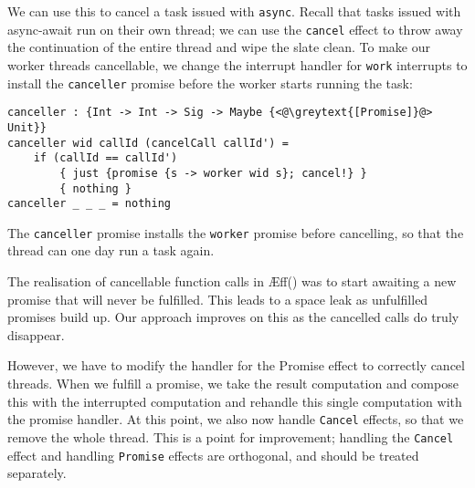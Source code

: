 \documentclass[msc,deptreport,cs]{infthesis} %
\newcommand{\code}[1]{\lstinline{#1}}
\newcommand{\texthighlight}[1]{%
  \colorbox{red!20}{#1}}
\newcommand{\greytext}[1]{\textcolor{black!40}{#1}}
\newcommand\aeff{{\AE}ff\xspace}
\newcommand{\todo}[1]
           {{\par\noindent\small\color{RoyalPurple}
  \framebox{\parbox{\dimexpr\linewidth-2\fboxsep-2\fboxrule}
    {\textbf{TODO:} #1}}}}
\begin{document}
\noindent We can use this to cancel a task issued with \code{async}. Recall that
tasks issued with async-await run on their own thread; we can use the
\code{cancel} effect to throw away the continuation of the entire thread and
wipe the slate clean. To make our worker threads cancellable, we change the
interrupt handler for \code{work} interrupts to install the \code{canceller}
promise before the worker starts running the task:


\begin{lstlisting}
canceller : {Int -> Int -> Sig -> Maybe {<@\greytext{[Promise]}@> Unit}}
canceller wid callId (cancelCall callId') =
    if (callId == callId')
        { just {promise {s -> worker wid s}; cancel!} }
        { nothing }
canceller _ _ _ = nothing
\end{lstlisting}

\noindent The \code{canceller} promise installs the \code{worker} promise before
cancelling, so that the thread can one day run a task again. \todo{fix}


The realisation of cancellable function calls in
\aeff(\cite{ahman2020asynchronous}) was to start awaiting a new promise that
will never be fulfilled. This leads to a space leak as unfulfilled promises
build up. Our approach improves on this as the cancelled calls do truly
disappear.


However, we have to modify the handler for the \textsf{Promise} effect to
correctly cancel threads. When we fulfill a promise, we take the result
computation and compose this with the interrupted computation and rehandle this
single computation with the promise handler. At this point, we also now handle
\code{Cancel} effects, so that we remove the whole thread. This is a point for
improvement; handling the \code{Cancel} effect and handling \code{Promise}
effects are orthogonal, and should be treated separately.
\end{document}
